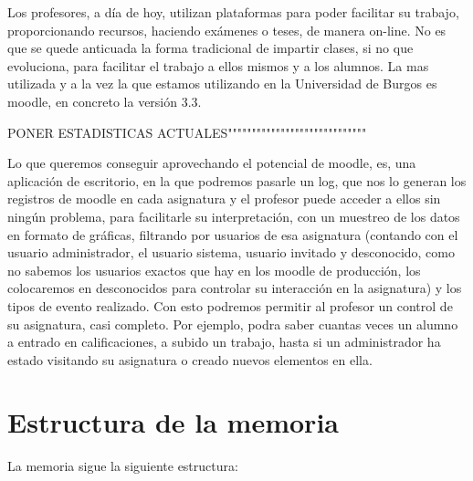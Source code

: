 
Los profesores, a día de hoy, utilizan plataformas para poder facilitar su trabajo, proporcionando recursos, haciendo exámenes o teses, de manera on-line. No es que se quede anticuada la forma tradicional de impartir clases, si no que evoluciona, para facilitar el trabajo a ellos mismos y a los alumnos.
La mas utilizada y a la vez la que estamos utilizando en la Universidad de Burgos es moodle, en concreto la versión 3.3.

PONER ESTADISTICAS ACTUALES"""""""""""""""""""""""""""""

Lo que queremos conseguir aprovechando el potencial de moodle, es, una aplicación de escritorio, en la que podremos pasarle un log, que nos lo generan los registros de moodle en cada asignatura y el profesor puede acceder a ellos sin ningún problema, para facilitarle su interpretación, con un muestreo de los datos en formato de gráficas, filtrando por usuarios de esa asignatura (contando con el usuario administrador, el usuario sistema, usuario invitado y desconocido, como no sabemos los usuarios exactos que hay en los moodle de producción, los colocaremos en desconocidos para controlar su interacción en la asignatura) y los tipos de evento realizado. 
Con esto podremos permitir al profesor un control de su asignatura, casi completo. Por ejemplo, podra saber cuantas veces un alumno a entrado en calificaciones, a subido un trabajo, hasta si un administrador ha estado visitando su asignatura o creado nuevos elementos en ella.

\section{Estructura de la memoria}\label{estructura-de-la-memoria}

La memoria sigue la siguiente estructura:

